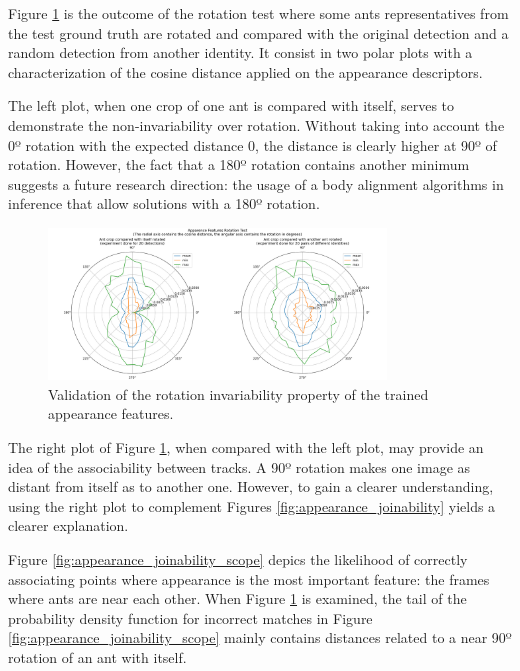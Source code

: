 
{
    Figure \ref{fig:rotation_test} is the outcome of the rotation test where some ants representatives from the test ground truth are rotated and compared with the original detection and a random detection from another identity. 
    It consist in two polar plots with a characterization of the cosine distance applied on the appearance descriptors. 
}

{
    The left plot, when one crop of one ant is compared with itself, serves to demonstrate the non-invariability over rotation. 
    Without taking into account the 0º rotation with the expected distance 0, the distance is clearly higher at \textpm90º of rotation. 
    However, the fact that a 180º rotation contains another minimum suggests a future research direction: the usage of a body alignment algorithms in inference that allow solutions with a 180º rotation.
}

\begin{figure}[!hp]
    \centering
    \includegraphics[width=0.8\textwidth]{figures/06_results/atr/rotation_all_ants_0-007.png}
    \caption[Appearance features rotation test]{\footnotesize{Validation of the rotation invariability property of the trained appearance features.}}
    \label{fig:rotation_test}
    \vspace{-1.5em}
\end{figure}

{
    The right plot of Figure \ref{fig:rotation_test}, when compared with the left plot, may provide an idea of the associability between tracks. 
    A 90º rotation makes one image as distant from itself as to another one. 
    However, to gain a clearer understanding, using the right plot to complement Figures \ref{fig:appearance_joinability} yields a clearer explanation.
}

{
    Figure \ref{fig:appearance_joinability_scope} depics the likelihood of correctly associating points where appearance is the most important feature: 
    the frames where ants are near each other. 
    When Figure \ref{fig:rotation_test} is examined, the tail of the probability density function for incorrect matches in Figure \ref{fig:appearance_joinability_scope} mainly contains distances related to a near 90º rotation of an ant with itself. 
}

